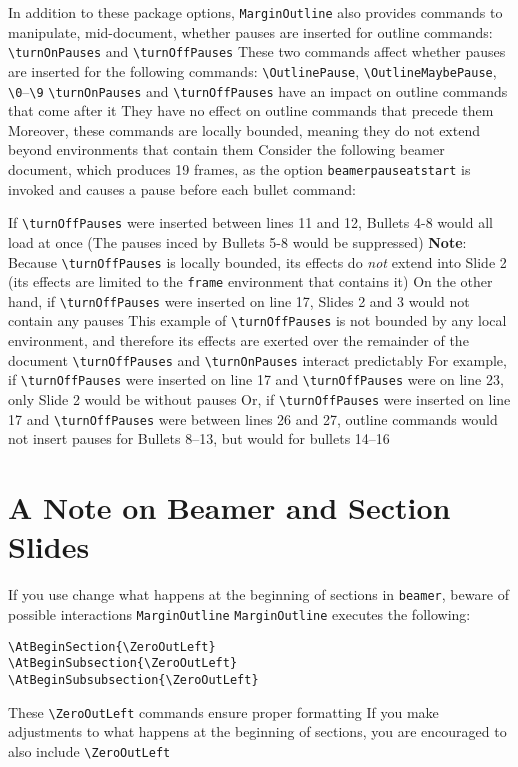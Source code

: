 \documentclass[11pt]{article}
\begin{document}
\1 In addition to these package options, \verb+MarginOutline+ also provides commands to manipulate, mid-document, whether pauses are inserted for outline commands: \verb+\turnOnPauses+ and \verb+\turnOffPauses+
	\2 These two commands affect whether pauses are inserted for the following commands: \verb+\OutlinePause+, \verb+\OutlineMaybePause+, \verb+\0+--\verb+\9+
	\2 \verb+\turnOnPauses+ and \verb+\turnOffPauses+ have an impact on outline commands that come after it
		\3 They have no effect on outline commands that precede them
	\2 Moreover, these commands are locally bounded, meaning they do not extend beyond environments that contain them
		\3 Consider the following beamer document, which produces 19 frames, as the option \verb+beamerpauseatstart+ is invoked and causes a pause before each bullet command:
		\begin{center}
		\end{center}
		\3 If \verb+\turnOffPauses+ were inserted between lines 11 and 12, Bullets 4-8 would all load at once
			\4 (The pauses inced by Bullets 5-8 would be suppressed)
			\4 \textbf{Note}: Because \verb+\turnOffPauses+ is locally bounded, its effects do \textit{not} extend into Slide 2 (its effects are limited to the \verb+frame+ environment that contains it)
		\3 On the other hand, if \verb+\turnOffPauses+ were inserted on line 17, Slides 2 and 3 would not contain any pauses
			\4 This example of \verb+\turnOffPauses+ is not bounded by any local environment, and therefore its effects are exerted over the remainder of the document
		\3 \verb+\turnOffPauses+ and \verb+\turnOnPauses+ interact predictably
			\4 For example, if \verb+\turnOffPauses+ were inserted on line 17 and \verb+\turnOffPauses+ were on line 23, only Slide 2 would be without pauses
			\4 Or, if \verb+\turnOffPauses+ were inserted on line 17 and \verb+\turnOffPauses+ were between lines 26 and 27, outline commands would not insert pauses for Bullets 8--13, but would for bullets 14--16

\section{A Note on Beamer and Section Slides}\label{sec:Slide}
\1 If you use change what happens at the beginning of sections in \verb+beamer+, beware of possible interactions \verb+MarginOutline+
	\2 \verb+MarginOutline+ executes the following:
		\begin{center}
		\begin{minipage}{.7\linewidth}
		\begin{verbatim}
\AtBeginSection{\ZeroOutLeft}
\AtBeginSubsection{\ZeroOutLeft}
\AtBeginSubsubsection{\ZeroOutLeft}	
		\end{verbatim}
		\end{minipage}
		\end{center}
	\2 These \verb+\ZeroOutLeft+ commands ensure proper formatting
		\3 If you make adjustments to what happens at the beginning of sections, you are encouraged to also include \verb+\ZeroOutLeft+
\end{document}
